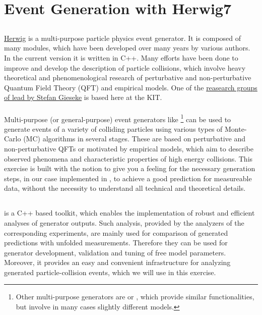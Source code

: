 \documentclass[a4paper,12pt]{article}
\begin{document}
    \names

    \section*{Event Generation with Herwig7}

    \subsection*{\Herwig}

    \hyperref{https://herwig.hepforge.org/}{}{}{Herwig} is a multi-purpose particle physics event generator.
    It is composed of many modules, which have been developed over many years by various authors.
    In the current version it is written in C++.
    Many efforts have been done to improve and develop the description of particle collisions, which involve heavy theoretical and phenomenological research of perturbative and non-perturbative Quantum Field Theory (QFT) and empirical models.
    One of the \hyperref{https://www.itp.kit.edu/memberpages/gieseke}{}{}{reasearch groups of \Herwig lead by Stefan Gieseke} is based here at the KIT.
    \\\\
    Multi-purpose (or general-purpose) event generators like \Herwig\footnote{Other multi-purpose generators are \hyperref{http://home.thep.lu.se/Pythia/}{}{}{\Pythia} or \hyperref{https://sherpa-team.gitlab.io/}{}{}{\Sherpa}, which provide similar functionalities, but involve in many cases slightly different models.} can be used to generate events of a variety of colliding particles using various types of Monte-Carlo (MC) algorithms in several stages.
    These are based on perturbative and non-perturbative QFTs or motivated by empirical models, which aim to describe observed phenomena and characteristic properties of high energy collisions.
    This exercise is built with the notion to give you a feeling for the necessary generation steps, in our case implemented in \Herwig, to achieve a good prediction for measureable data, without the necessity to understand all technical and theoretical details.


    \subsection*{\Rivet}

    \hyperref{https://rivet.hepforge.org/}{}{}{\Rivet} is a C++ based toolkit, which enables the implementation of robust and efficient analyses of generator outputs.
    Such analysis, provided by the analyzers of the corresponding experiments, are mainly used for comparison of generated predictions with unfolded measurements.
    Therefore they can be used for generator development, validation and tuning of free model parameters.
    Moreover, it provides an easy and convenient infrastructure for analyzing generated particle-collision events, which we will use in this exercise.
\end{document}
